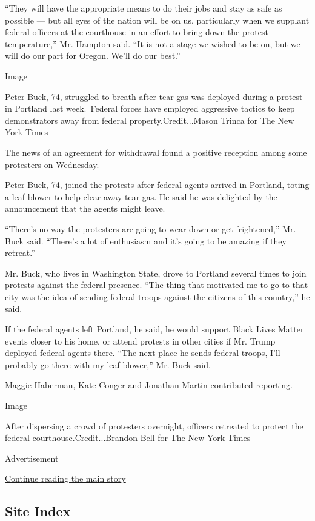 ``They will have the appropriate means to do their jobs and stay as safe
as possible --- but all eyes of the nation will be on us, particularly
when we supplant federal officers at the courthouse in an effort to
bring down the protest temperature,'' Mr. Hampton said. ``It is not a
stage we wished to be on, but we will do our part for Oregon. We'll do
our best.''

Image

Peter Buck, 74, struggled to breath after tear gas was deployed during a
protest in Portland last week.~Federal forces have employed aggressive
tactics to keep demonstrators away from federal property.Credit...Mason
Trinca for The New York Times

The news of an agreement for withdrawal found a positive reception among
some protesters on Wednesday.

Peter Buck, 74, joined the protests after federal agents arrived in
Portland, toting a leaf blower to help clear away tear gas. He said he
was delighted by the announcement that the agents might leave.

``There's no way the protesters are going to wear down or get
frightened,'' Mr. Buck said. ``There's a lot of enthusiasm and it's
going to be amazing if they retreat.''

Mr. Buck, who lives in Washington State, drove to Portland several times
to join protests against the federal presence. ``The thing that
motivated me to go to that city was the idea of sending federal troops
against the citizens of this country,'' he said.

If the federal agents left Portland, he said, he would support Black
Lives Matter events closer to his home, or attend protests in other
cities if Mr. Trump deployed federal agents there. ``The next place he
sends federal troops, I'll probably go there with my leaf blower,'' Mr.
Buck said.

Maggie Haberman, Kate Conger and Jonathan Martin contributed reporting.

Image

After dispersing a crowd of protesters overnight, officers retreated to
protect the federal courthouse.Credit...Brandon Bell for The New York
Times

Advertisement

\protect\hyperlink{after-bottom}{Continue reading the main story}

\hypertarget{site-index}{%
\subsection{Site Index}\label{site-index}}

